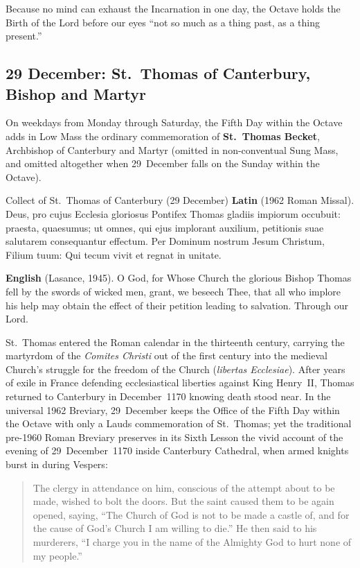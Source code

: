 Because no mind can exhaust the Incarnation in one day, the Octave holds the
Birth of the Lord before our eyes ``not so much as a thing past, as a thing
present.''

\subsection{29 December: St.~Thomas of Canterbury, Bishop and Martyr}

On weekdays from Monday through Saturday, the Fifth Day within the Octave adds
in Low Mass the ordinary commemoration of \textbf{St.~Thomas Becket},
Archbishop of Canterbury and Martyr (omitted in non-conventual Sung Mass, and
omitted altogether when 29~December falls on the Sunday within the Octave).

\begin{massbox}{Collect of St.~Thomas of Canterbury (29 December)}
\textbf{Latin} (1962 Roman Missal). Deus, pro cujus Ecclesia gloriosus Pontifex
Thomas gladiis impiorum occubuit: praesta, quaesumus; ut omnes, qui ejus
implorant auxilium, petitionis suae salutarem consequantur effectum. Per Dominum
nostrum Jesum Christum, Filium tuum: Qui tecum vivit et regnat in unitate.

\textbf{English} (Lasance, 1945). O God, for Whose Church the glorious Bishop
Thomas fell by the swords of wicked men, grant, we beseech Thee, that all who
implore his help may obtain the effect of their petition leading to salvation.
Through our Lord.
\end{massbox}

St.~Thomas entered the Roman calendar in the thirteenth century, carrying the
martyrdom of the \textit{Comites Christi} out of the first century into the
medieval Church's struggle for the freedom of the Church (\textit{libertas
Ecclesiae}). After years of exile in France defending ecclesiastical liberties
against King Henry~II, Thomas returned to Canterbury in December~1170 knowing
death stood near. In the universal 1962 Breviary, 29~December keeps the Office
of the Fifth Day within the Octave with only a Lauds commemoration of
St.~Thomas; yet the traditional pre-1960 Roman Breviary preserves in its Sixth
Lesson the vivid account of the evening of 29~December~1170 inside Canterbury
Cathedral, when armed knights burst in during Vespers:

\begin{quote}
The clergy in attendance on him, conscious of the attempt about to be made,
wished to bolt the doors. But the saint caused them to be again opened, saying,
``The Church of God is not to be made a castle of, and for the cause of God's
Church I am willing to die.'' He then said to his murderers, ``I charge you in
the name of the Almighty God to hurt none of my people.''
\end{quote}

